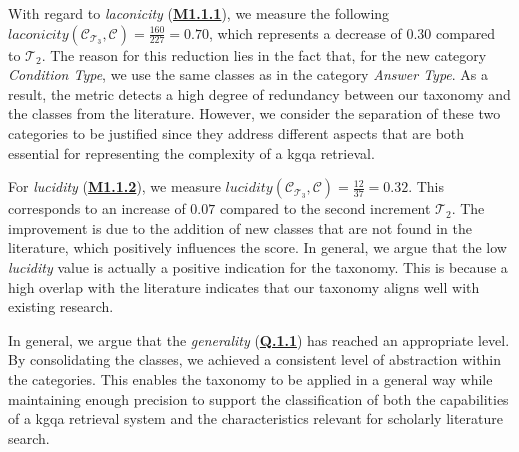 \begin{sloppypar}
    With regard to \emph{laconicity} (\hyperref[tab:gqm_taxonomy_validation]{\textbf{M1.1.1}}), we measure the following $laconicity(\mathcal{C}_{\mathcal{T}_3}, \mathcal{C}) = \frac{160}{227} = 0.70$, which represents a decrease of $0.30$ compared to $\mathcal{T}_2$. The reason for this reduction lies in the fact that, for the new category \emph{Condition Type}, we use the same classes as in the category \emph{Answer Type}. As a result, the metric detects a high degree of redundancy between our taxonomy and the classes from the literature. However, we consider the separation of these two categories to be justified since they address different aspects that are both essential for representing the complexity of a \gls{kgqa} retrieval.
    
    For \emph{lucidity} (\hyperref[tab:gqm_taxonomy_validation]{\textbf{M1.1.2}}), we measure $lucidity(\mathcal{C}_{\mathcal{T}_3}, \mathcal{C}) = \frac{12}{37} = 0.32$. This corresponds to an increase of $0.07$ compared to the second increment $\mathcal{T}_2$. The improvement is due to the addition of new classes that are not found in the literature, which positively influences the score. In general, we argue that the low \emph{lucidity} value is actually a positive indication for the taxonomy. This is because a high overlap with the literature indicates that our taxonomy aligns well with existing research.
    
    In general, we argue that the \emph{generality} (\hyperref[tab:gqm_taxonomy_validation]{\textbf{Q.1.1}}) has reached an appropriate level. By consolidating the classes, we achieved a consistent level of abstraction within the categories. This enables the taxonomy to be applied in a general way while maintaining enough precision to support the classification of both the capabilities of a \gls{kgqa} retrieval system and the characteristics relevant for scholarly literature search. 
\end{sloppypar}

